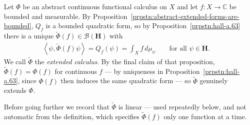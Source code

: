 \begin{definition}
    \label{def:abstract-extended-calculus}
    \leanok
    Let $\Phi$ be an abstract continuous functional calculus on $X$ and let $f : X \to \mathbb{C}$ be bounded and measurable. By Proposition~\ref{prpstn:abstract-extended-forms-are-bounded}, $Q_f$ is a bounded quadratic form, so by Proposition~\ref{prpstn:hall-a.63} there is a unique $\widetilde\Phi(f) \in \mathcal{B}(\mathbf{H})$ with
    \begin{align}
        \left< \psi, \widetilde\Phi(f)\psi \right> = Q_f(\psi) = \int_X f \, d\mu_\psi \qquad \text{for all } \psi \in \mathbf{H}.
    \end{align}
    We call $\widetilde\Phi$ the \textit{extended calculus}. By the final claim of that proposition, $\widetilde\Phi(f) = \Phi(f)$ for continuous $f$ — by uniqueness in Proposition~\ref{prpstn:hall-a.63}, since $\Phi(f)$ then induces the same quadratic form — so $\widetilde\Phi$ genuinely extends $\Phi$.
\end{definition}

Before going further we record that $\widetilde\Phi$ is linear — used repeatedly below, and not automatic from the definition, which specifies $\widetilde\Phi(f)$ only one function at a time.

